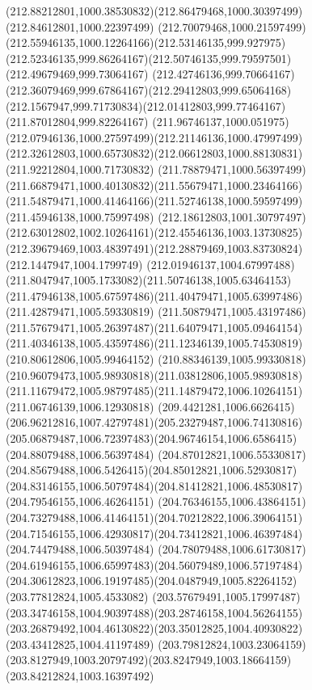 {{		\curveto(212.88212801,1000.38530832)(212.86479468,1000.30397499)(212.84612801,1000.22397499)
		\curveto(212.70079468,1000.21597499)(212.55946135,1000.12264166)(212.53146135,999.927975)
		\curveto(212.52346135,999.86264167)(212.50746135,999.79597501)(212.49679469,999.73064167)
		\curveto(212.42746136,999.70664167)(212.36079469,999.67864167)(212.29412803,999.65064168)
		\curveto(212.1567947,999.71730834)(212.01412803,999.77464167)(211.87012804,999.82264167)
		\curveto(211.96746137,1000.051975)(212.07946136,1000.27597499)(212.21146136,1000.47997499)
		\curveto(212.32612803,1000.65730832)(212.06612803,1000.88130831)(211.92212804,1000.71730832)
		\curveto(211.78879471,1000.56397499)(211.66879471,1000.40130832)(211.55679471,1000.23464166)
		\curveto(211.54879471,1000.41464166)(211.52746138,1000.59597499)(211.45946138,1000.75997498)
		\curveto(212.18612803,1001.30797497)(212.63012802,1002.10264161)(212.45546136,1003.13730825)
		\curveto(212.39679469,1003.48397491)(212.28879469,1003.83730824)(212.1447947,1004.1799749)
		\curveto(212.01946137,1004.67997488)(211.8047947,1005.1733082)(211.50746138,1005.63464153)
		\curveto(211.47946138,1005.67597486)(211.40479471,1005.63997486)(211.42879471,1005.59330819)
		\curveto(211.50879471,1005.43197486)(211.57679471,1005.26397487)(211.64079471,1005.09464154)
		\curveto(211.40346138,1005.43597486)(211.12346139,1005.74530819)(210.80612806,1005.99464152)
		\curveto(210.88346139,1005.99330818)(210.96079473,1005.98930818)(211.03812806,1005.98930818)
		\curveto(211.11679472,1005.98797485)(211.14879472,1006.10264151)(211.06746139,1006.12930818)
		\curveto(209.4421281,1006.6626415)(206.96212816,1007.42797481)(205.23279487,1006.74130816)
		\curveto(205.06879487,1006.72397483)(204.96746154,1006.6586415)(204.88079488,1006.56397484)
		\curveto(204.87012821,1006.55330817)(204.85679488,1006.5426415)(204.85012821,1006.52930817)
		\curveto(204.83146155,1006.50797484)(204.81412821,1006.48530817)(204.79546155,1006.46264151)
		\curveto(204.76346155,1006.43864151)(204.73279488,1006.41464151)(204.70212822,1006.39064151)
		\curveto(204.71546155,1006.42930817)(204.73412821,1006.46397484)(204.74479488,1006.50397484)
		\curveto(204.78079488,1006.61730817)(204.61946155,1006.65997483)(204.56079489,1006.57197484)
		\curveto(204.30612823,1006.19197485)(204.0487949,1005.82264152)(203.77812824,1005.4533082)
		\curveto(203.57679491,1005.17997487)(203.34746158,1004.90397488)(203.28746158,1004.56264155)
		\curveto(203.26879492,1004.46130822)(203.35012825,1004.40930822)(203.43412825,1004.41197489)
		\moveto(203.79812824,1003.23064159)
		\curveto(203.8127949,1003.20797492)(203.8247949,1003.18664159)(203.84212824,1003.16397492)
}}
